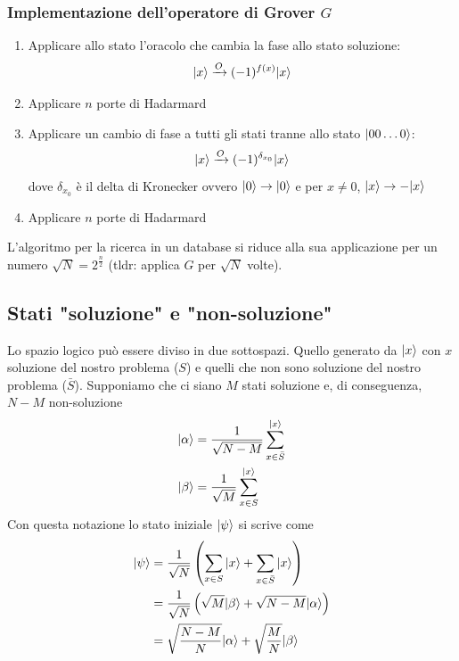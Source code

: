 \documentclass[12pt, a4paper]{report}
\begin{document}
\subsubsection{Implementazione dell'operatore di Grover $G$}
\begin{enumerate}
    \item Applicare allo stato l'oracolo che cambia la fase allo stato soluzione: \begin{equation*}
        | x \rangle\xrightarrow{O}(-1)^{f(x)}| x \rangle
    \end{equation*}
    \item Applicare $n$ porte di Hadarmard
    \item Applicare un cambio di fase a tutti gli stati tranne allo stato $| 00\ldots 0 \rangle$: \begin{equation*}
        | x \rangle\xrightarrow{O}(-1)^{\delta_{x_{0}}}| x \rangle
    \end{equation*} dove $\delta_{x_{0}}$ è il delta di Kronecker ovvero $| 0 \rangle\rightarrow| 0 \rangle$ e per $x\neq 0$, $| x \rangle\rightarrow -| x \rangle$
    \item Applicare $n$ porte di Hadarmard
\end{enumerate}
L'algoritmo per la ricerca in un database si riduce alla sua applicazione per un numero $\sqrt{N}=2^{\frac{n}{2}}$ (tldr: applica $G$ per $\sqrt{N}$ volte).
\subsection{Stati "soluzione" e "non-soluzione"}
Lo spazio logico può essere diviso in due sottospazi. Quello generato da $| x \rangle$ con $x$ soluzione del nostro problema ($S$) e quelli che non sono soluzione del nostro problema ($\bar{S}$). Supponiamo che ci siano $M$ stati soluzione e, di conseguenza, $N-M$ non-soluzione
\begin{equation*}
    \begin{split}
        | \alpha \rangle &= \frac{1}{\sqrt{N-M}}\sum_{x\in\bar{S}}^{| x \rangle} \\
        | \beta \rangle &= \frac{1}{\sqrt{M}}\sum_{x\in S}^{| x \rangle}
    \end{split}
\end{equation*}
Con questa notazione lo stato iniziale $| \psi \rangle$ si scrive come
\begin{equation*}
    \begin{split}
        | \psi \rangle &= \frac{1}{\sqrt{N}}\left(\sum_{x\in S}| x \rangle+\sum_{x\in\bar{S}}| x \rangle\right) \\
        &= \frac{1}{\sqrt{N}}\left(\sqrt{M}| \beta \rangle+\sqrt{N-M}| \alpha \rangle\right) \\
        &= \sqrt{\frac{N-M}{N}}| \alpha \rangle+\sqrt{\frac{M}{N}}| \beta \rangle
    \end{split}
\end{equation*}
\end{document}
